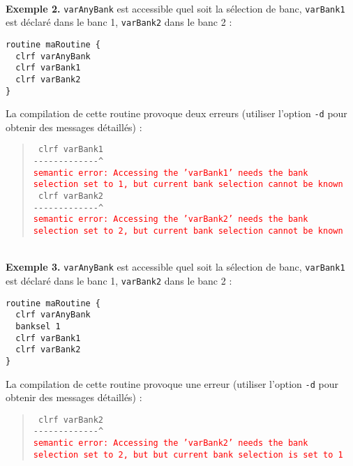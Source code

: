 ~\\
\textbf{Exemple 2.} \texttt{varAnyBank} est accessible quel soit la sélection de banc, \texttt{varBank1} est déclaré dans le banc 1, \texttt{varBank2} dans le banc 2 :
\begin{lstlisting}[language=piccolo]
routine maRoutine {
  clrf varAnyBank
  clrf varBank1
  clrf varBank2
}
\end{lstlisting}

La compilation de cette routine provoque deux erreurs (utiliser l’option \texttt{-d} pour obtenir des messages détaillés) :

\begin{quote}
\texttt{  clrf varBank1}\\
\texttt{-{-}-{-}-{-}-{-}-{-}-{-}-\^{}}\\
\textcolor{red}{\tt semantic error: Accessing the 'varBank1' needs the bank selection set to 1, but current bank selection cannot be known}\\

\texttt{  clrf varBank2}\\
\texttt{-{-}-{-}-{-}-{-}-{-}-{-}-\^}\\
\textcolor{red}{\tt semantic error: Accessing the 'varBank2' needs the bank selection set to 2, but current bank selection cannot be known}
\end{quote}




~\\
\textbf{Exemple 3.} \texttt{varAnyBank} est accessible quel soit la sélection de banc, \texttt{varBank1} est déclaré dans le banc 1, \texttt{varBank2} dans le banc 2 :
\begin{lstlisting}[language=piccolo]
routine maRoutine {
  clrf varAnyBank
  banksel 1
  clrf varBank1
  clrf varBank2
}
\end{lstlisting}

La compilation de cette routine provoque une erreur (utiliser l’option \texttt{-d} pour obtenir des messages détaillés) :

\begin{quote}
\texttt{  clrf varBank2}\\
\texttt{-{-}-{-}-{-}-{-}-{-}-{-}-\^}\\
\textcolor{red}{\tt semantic error: Accessing the 'varBank2' needs the bank selection set to 2, but but current bank selection is set to 1}
\end{quote}













